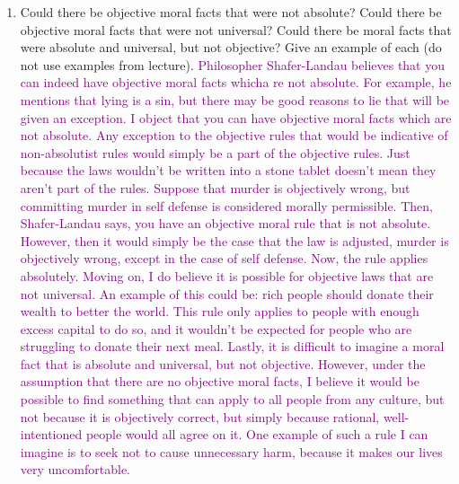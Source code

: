 \documentclass[12pt]{article}
\newcommand{\ans}[1]{\textcolor{purple}{#1}}
\begin{document}
\begin{enumerate}
    \item Could there be objective moral facts that were not absolute? Could there be objective moral facts that were not universal? Could there be moral facts that were absolute and universal, but not objective? Give an example of each (do not use examples from lecture). \ans{Philosopher Shafer-Landau believes that you can indeed have objective moral facts whicha re not absolute. For example, he mentions that lying is a sin, but there may be good reasons to lie that will be given an exception. I object that you can have objective moral facts which are not absolute. Any exception to the objective rules that would be indicative of non-absolutist rules would simply be a part of the objective rules. Just because the laws wouldn't be written into a stone tablet doesn't mean they aren't part of the rules. Suppose that murder is objectively wrong, but committing murder in self defense is considered morally permissible. Then, Shafer-Landau says, you have an objective moral rule that is not absolute. However, then it would simply be the case that the law is adjusted, murder is objectively wrong, except in the case of self defense. Now, the rule applies absolutely. Moving on, I do believe it is possible for objective laws that are not universal. An example of this could be: rich people should donate their wealth to better the world. This rule only applies to people with enough excess capital to do so, and it wouldn't be expected for people who are struggling to donate their next meal. Lastly, it is difficult to imagine a moral fact that is absolute and universal, but not objective. However, under the assumption that there are no objective moral facts, I believe it would be possible to find something that can apply to all people from any culture, but not because it is objectively correct, but simply because rational, well-intentioned people would all agree on it. One example of such a rule I can imagine is to seek not to cause unnecessary harm, because it makes our lives very uncomfortable.}

\end{enumerate}
\end{document}
